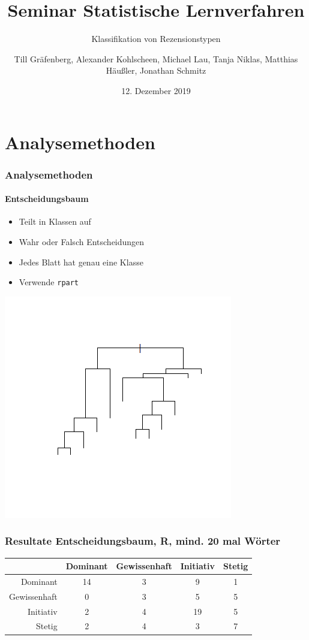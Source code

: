 \documentclass{beamer}
\title{Seminar Statistische Lernverfahren}
\subtitle{Klassifikation von Rezensionstypen}
\author[T.G., A.K., M.L., T.N., M.H., J.S.]{Till Gräfenberg, Alexander Kohlscheen, Michael Lau, Tanja Niklas, Matthias Häußler, Jonathan Schmitz}
\date{12. Dezember 2019}
\begin{document}
\begin{frame}
\thispagestyle{empty}
\titlepage
\end{frame}

\section{Analysemethoden}
\begin{frame}
\frametitle{Analysemethoden}
\framesubtitle{Entscheidungsbaum}
\begin{itemize}\setlength\parskip{12pt}
\item Teilt in Klassen auf
\item Wahr oder Falsch Entscheidungen
\item Jedes Blatt hat genau eine Klasse
\item Verwende \texttt{rpart}
\end{itemize}
\begin{center}
	\includegraphics[scale=0.5]{RPart.png}
\end{center}
\end{frame}
\begin{frame}
\frametitle{Resultate Entscheidungsbaum, R, mind. 20 mal Wörter}
\begin{center}
\begin{tabular}{r|c|c|c|c|}
 &  Dominant  & Gewissenhaft & Initiativ & Stetig\\
\hline
Dominant & 14 & 3 & 9 & 1 \\
Gewissenhaft & 0 & 3 & 5 & 5\\
Initiativ & 2 & 4 & 19 & 5\\
Stetig & 2 & 4 & 3 & 7
\end{tabular}
\end{center}
\end{frame}
\end{document}
